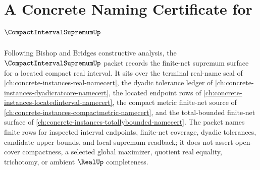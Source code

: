 \chapter{A Concrete Naming Certificate for $\CompactIntervalSupremumUp$}
\label{ch:concrete-instances-compact-interval-supremum-namecert}

Following Bishop and Bridges constructive analysis, the $\CompactIntervalSupremumUp$ packet records the finite-net supremum surface for a located compact real interval. It sits over the terminal real-name seal of \autoref{ch:concrete-instances-real-namecert}, the dyadic tolerance ledger of \autoref{ch:concrete-instances-dyadicratcore-namecert}, the located endpoint rows of \autoref{ch:concrete-instances-locatedinterval-namecert}, the compact metric finite-net source of \autoref{ch:concrete-instances-compactmetric-namecert}, and the total-bounded finite-net surface of \autoref{ch:concrete-instances-totallybounded-namecert}. The packet names finite rows for inspected interval endpoints, finite-net coverage, dyadic tolerances, candidate upper bounds, and local supremum readback; it does not assert open-cover compactness, a selected global maximizer, quotient real equality, trichotomy, or ambient $\RealUp$ completeness.

